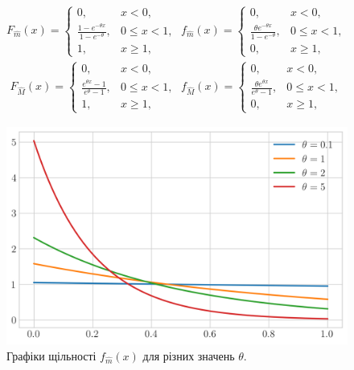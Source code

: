 \begin{theorem}
    \begin{gather}
        F_{\widehat{m}}(x) = \begin{cases}
            0, & x < 0, \\
            \frac{1 - e^{-\theta x}}{1 - e^{-\theta}}, & 0 \leq x < 1, \\
            1, & x \geq 1,
        \end{cases}\;
        f_{\widehat{m}}(x) = \begin{cases}
            0, & x < 0, \\
            \frac{\theta e^{-\theta x}}{1 - e^{-\theta}}, & 0 \leq x < 1, \\
            0, & x \geq 1,
        \end{cases}
    \end{gather}
    \begin{gather}
        F_{\widehat{M}}(x) = \begin{cases}
            0, & x < 0, \\
            \frac{e^{\theta x} - 1}{e^{\theta} - 1}, & 0 \leq x < 1, \\
            1, & x \geq 1,
        \end{cases}\;
        f_{\widehat{M}}(x) = \begin{cases}
            0, & x < 0, \\
            \frac{\theta e^{\theta x}}{e^{\theta} - 1}, & 0 \leq x < 1, \\
            0, & x \geq 1,
        \end{cases}
    \end{gather}
    \begin{figure}[H]
        \centering
        \includegraphics[scale=0.65]{plots/pdf_min_hat.png}
        \caption{Графіки щільності $f_{\widehat{m}}(x)$ для різних значень $\theta$.}

\end{figure}
\end{theorem}
